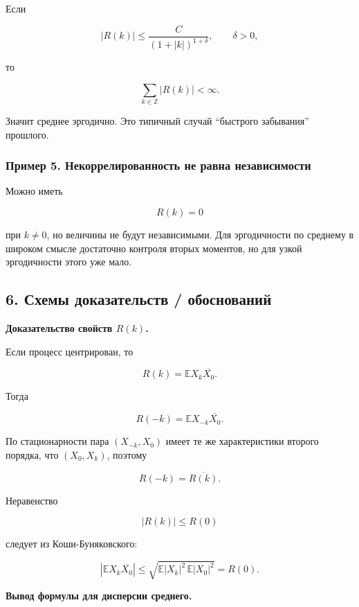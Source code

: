 \documentclass[
  11pt,
  a4paper,
]{article}
\begin{document}
Если

\[
|R(k)|\le \frac{C}{(1+|k|)^{1+\delta}},
\qquad
\delta>0,
\]

то

\[
\sum_{k\in\mathbb Z}|R(k)|<\infty.
\]

Значит среднее эргодично. Это типичный случай ``быстрого забывания''
прошлого.

\subsubsection{Пример 5. Некоррелированность не равна
независимости}\label{ux43fux440ux438ux43cux435ux440-5.-ux43dux435ux43aux43eux440ux440ux435ux43bux438ux440ux43eux432ux430ux43dux43dux43eux441ux442ux44c-ux43dux435-ux440ux430ux432ux43dux430-ux43dux435ux437ux430ux432ux438ux441ux438ux43cux43eux441ux442ux438}

Можно иметь

\[
R(k)=0
\]

при \(k\ne0\), но величины не будут независимыми. Для эргодичности по
среднему в широком смысле достаточно контроля вторых моментов, но для
узкой эргодичности этого уже мало.

\subsection{6. Схемы доказательств /
обоснований}\label{ux441ux445ux435ux43cux44b-ux434ux43eux43aux430ux437ux430ux442ux435ux43bux44cux441ux442ux432-ux43eux431ux43eux441ux43dux43eux432ux430ux43dux438ux439}

\textbf{Доказательство свойств \(R(k)\).}

Если процесс центрирован, то

\[
R(k)=\mathbb E X_k\overline{X_0}.
\]

Тогда

\[
R(-k)=\mathbb E X_{-k}\overline{X_0}.
\]

По стационарности пара \((X_{-k},X_0)\) имеет те же характеристики
второго порядка, что \((X_0,X_k)\), поэтому

\[
R(-k)=\overline{R(k)}.
\]

Неравенство

\[
|R(k)|\le R(0)
\]

следует из Коши-Буняковского:

\[
|\mathbb E X_k\overline{X_0}|
\le
\sqrt{\mathbb E|X_k|^2\,\mathbb E|X_0|^2}
=R(0).
\]

\textbf{Вывод формулы для дисперсии среднего.}
\end{document}
